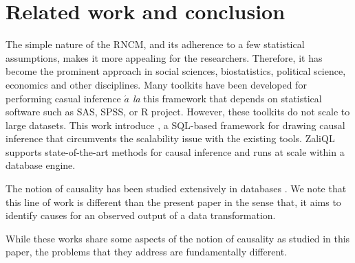 \vspace{-.42cm}
\section{Related work and conclusion}
\label{sec:rel}

The simple nature of the RNCM, and its adherence to a few statistical assumptions, makes it more appealing for the researchers. Therefore,
 it has become the  prominent approach in social sciences, biostatistics, political science, economics
 and other disciplines. Many toolkits have been developed for performing casual inference  {\em $\acute{a}$ la} this framework that
 depends on  statistical software such as SAS, SPSS, or R project. However, these toolkits do not scale to large datasets. This work introduce  \GSQL,  a SQL-based framework for drawing causal
  inference that circumvents the scalability issue with the existing
  tools. ZaliQL supports state-of-the-art methods for causal
  inference and runs at scale within a database engine.


The notion of causality has been studied extensively in databases \cite{MeliouGMS2011,RoyS14,DBLP:conf/icdt/SalimiB15,SalimiTaPP16}.  We note that this line of work is different than the present paper in the sense that, it aims to identify causes for an observed output of a data transformation.  While these works share some aspects of the notion of causality as studied in this paper, the problems that they address are fundamentally different. 